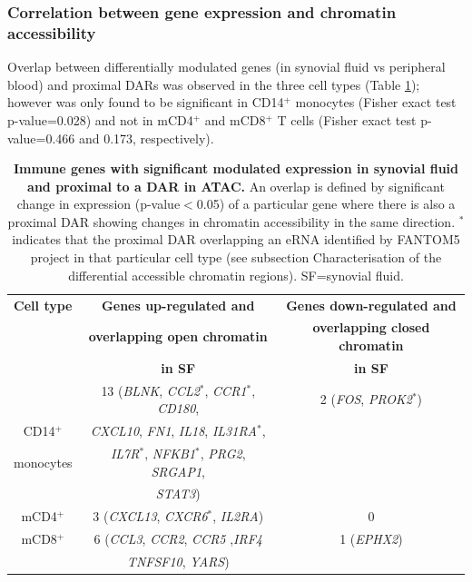 \subsubsection{Correlation between gene expression and chromatin accessibility}
Overlap between differentially modulated genes (in synovial fluid vs peripheral blood) and proximal DARs was observed in the three cell types (Table \ref{tab:PSA_gene_expression_ATAC_overlap}); however was only found to be significant in CD14$^+$ monocytes (Fisher exact test p-value=0.028) and not in mCD4$^+$ and mCD8$^+$ T cells (Fisher exact test p-value=0.466 and 0.173, respectively).


\begin{table}[htbp]
\centering
\begin{tabular}{@{} c c c}
\toprule
\textbf{Cell type} & \textbf{Genes up-regulated and}        &  \textbf{Genes down-regulated and} \\
                   & \textbf{overlapping open chromatin}   &  \textbf{overlapping closed chromatin} \\
									 &	\textbf{in SF}				               &  \textbf{in SF} \\
\midrule
\midrule
          & 13 (\textit{BLNK}, \textit{CCL2$^\ast$}, \textit{CCR1$^\ast$}, \textit{CD180}, & 2 (\textit{FOS}, \textit{PROK2$^\ast$}) \\      CD14$^+$  & \textit{CXCL10}, \textit{FN1}, \textit{IL18}, \textit{IL31RA$^\ast$},    & \\
monocytes & \textit{IL7R$^\ast$}, \textit{NFKB1$^\ast$}, \textit{PRG2}, \textit{SRGAP1}, & \\
				  & \textit{STAT3}) & \\
				
\midrule
mCD4$^+$ & 3 (\textit{CXCL13}, \textit{CXCR6$^\ast$}, \textit{IL2RA}) & 0 \\

\midrule
mCD8$^+$ & 6 (\textit{CCL3}, \textit{CCR2}, \textit{CCR5} ,\textit{IRF4} & 1 (\textit{EPHX2}) \\
         & \textit{TNFSF10}, \textit{YARS}) & \\

\bottomrule
\end{tabular}
\medskip %
\caption[Immune genes with significant modulated expression in synovial fluid and proximal to a DAR in ATAC.]{\textbf{Immune genes with significant modulated expression in synovial fluid and proximal to a DAR in ATAC.} An overlap is defined by significant change in expression (p-value$<$0.05) of a particular gene where there is also a proximal DAR showing changes in chromatin accessibility in the same direction. $^\ast$ indicates that the proximal DAR overlapping an eRNA identified by FANTOM5 project in that particular cell type (see subsection Characterisation of the differential accessible chromatin regions). SF=synovial fluid.}
\label{tab:PSA_gene_expression_ATAC_overlap}
\end{table}


